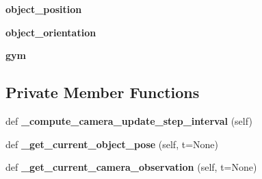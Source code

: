 \begin{DoxyCompactItemize}
{\bfseries object\+\_\+position}
\item 
\mbox{\label{classtrifinger__simulation_1_1trifinger__platform_1_1TriFingerPlatform_ab2187a510141b0e79671cc860c6031b7}} 
{\bfseries object\+\_\+orientation}
\item 
\mbox{\label{classtrifinger__simulation_1_1trifinger__platform_1_1TriFingerPlatform_a752fe7f768964427e2b67f07c2cbcfe2}} 
{\bfseries gym}
\end{DoxyCompactItemize}
\subsection*{Private Member Functions}
\begin{DoxyCompactItemize}
\item 
\mbox{\label{classtrifinger__simulation_1_1trifinger__platform_1_1TriFingerPlatform_aeb8f1699a36b339da4a787308c3f3731}} 
def {\bfseries \+\_\+compute\+\_\+camera\+\_\+update\+\_\+step\+\_\+interval} (self)
\item 
\mbox{\label{classtrifinger__simulation_1_1trifinger__platform_1_1TriFingerPlatform_a5ed284dedee9899105e5fc68e9c958a0}} 
def {\bfseries \+\_\+get\+\_\+current\+\_\+object\+\_\+pose} (self, t=None)
\item 
\mbox{\label{classtrifinger__simulation_1_1trifinger__platform_1_1TriFingerPlatform_a185d07d66efca2fc4f42d1717da1dc0c}} 
def {\bfseries \+\_\+get\+\_\+current\+\_\+camera\+\_\+observation} (self, t=None)
\end{DoxyCompactItemize}
